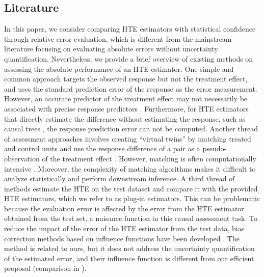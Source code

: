 \documentclass[twoside]{article}
\newcommand{\1}{{\mathbbm{1}}}
\begin{document}
\subsection{Literature}\label{sec:literature}

In this paper, we consider comparing HTE estimators with statistical confidence through relative error evaluation, which is different from the mainstream literature focusing on evaluating absolute errors without uncertainty quantification. 
Nevertheless, we provide a brief overview of existing methods on assessing the absolute performance of an HTE estimator.
One simple and common approach targets the observed response but not the treatment effect, and uses the standard prediction error of the response as the error measurement.
However, an accurate predictor of the treatment effect may not necessarily be associated with precise response predictors \parencite{curth2023search}.
Furthermore, for HTE estimators that directly estimate the difference without estimating the response, such as causal trees \parencite{athey2016recursive}, the response prediction error can not be computed.
Another thread of assessment approaches involves creating ``virtual twins'' by matching treated and control units and use the response difference of a pair as a pseudo-observation of the treatment effect \parencite{rolling2014model}.
However, matching is often computationally intensive \parencite{rosenbaum1989optimal}. Moreover, the complexity of matching algorithms makes it difficult to analyze statistically and perform downstream inference.
A third thread of methods estimate the HTE on the test dataset and compare it with the provided HTE estimators, which we refer to as plug-in estimators. This can be problematic because the evaluation error is affected by the error from the HTE estimator obtained from the test set, a nuisance function in this causal assessment task.
To reduce the impact of the error of the HTE estimator from the test data, bias correction methods based on influence functions have been developed \parencite{alaa2019validating}. 
The method is related to ours, but it does not address the uncertainty quantification of the estimated error, and their influence function is different from our efficient proposal (comparison in ).
\end{document}
